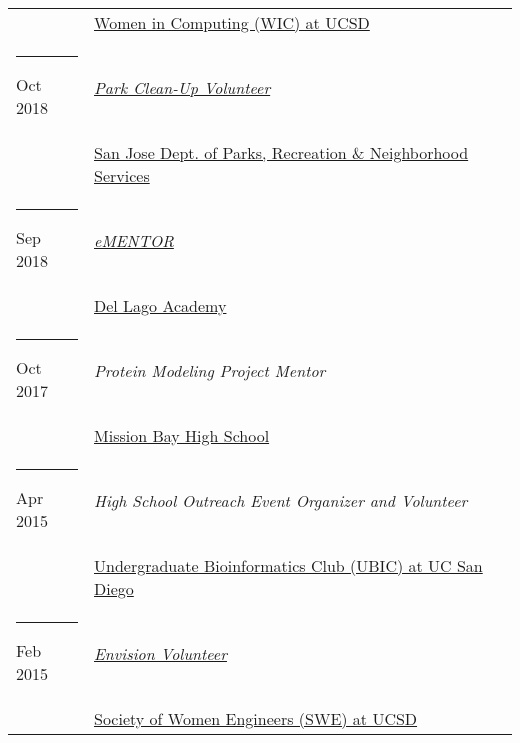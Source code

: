 \documentclass[margin,line]{res}
\begin{document}
\begin{resume}
\begin{longtable}{@{}p{0.7in}p{4in}}
\hspace*{-4mm} & \hspace{4mm} \href{http://wic.ucsd.edu/}{Women in Computing (WIC) at UCSD}\\
\hspace*{-4mm} \rule{-1mm}{5mm} Oct 2018 & \href{http://sanjoseca.gov/DocumentCenter/View/77567}{\textit{Park Clean-Up Volunteer}}\\*
\hspace*{-4mm} & \hspace{4mm} \href{http://www.sanjoseca.gov/index.aspx?NID=204}{San Jose Dept. of Parks, Recreation \& Neighborhood Services}\\
\hspace*{-4mm} \rule{-1mm}{5mm} Sep 2018 & \href{https://www.dellagoacademy.org/apps/pages/index.jsp?uREC_ID=1248617&type=d&pREC_ID=1474743}{\textit{eMENTOR}}\\*
\hspace*{-4mm} & \hspace{4mm} \href{https://www.dellagoacademy.org/}{Del Lago Academy}\\
\hspace*{-4mm} \rule{-1mm}{5mm} Oct 2017 & \textit{Protein Modeling Project Mentor}\\*
\hspace*{-4mm} & \hspace{4mm} \href{https://www.sandiegounified.org/schools/mission-bay}{Mission Bay High School}\\
\hspace*{-4mm} \rule{-1mm}{5mm} Apr 2015 & \textit{High School Outreach Event Organizer and Volunteer}\\*
\hspace*{-4mm} & \hspace{4mm} \href{http://ubicucsd.github.io/}{Undergraduate Bioinformatics Club (UBIC) at UC San Diego}\\
\hspace*{-4mm} \rule{-1mm}{5mm} Feb 2015 & \href{http://ucsdenvision.wixsite.com/envision}{\textit{Envision Volunteer}}\\*
\hspace*{-4mm} & \hspace{4mm} \href{http://swe.ucsd.edu/}{Society of Women Engineers (SWE) at UCSD}\\
\end{longtable}


\end{resume}
\end{document}
